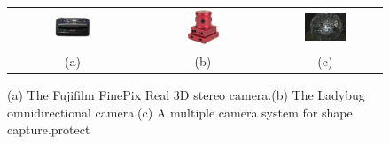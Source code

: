 \documentclass{report}
\begin{document}
\begin{savenotes}
\setlength{\tabcolsep}{4pt}
\begin{figure}
\centering
\begin{tabular}{ccc}
\includegraphics[trim=0.6in 0in 0.4in 0in, clip=true, width=0.3\textwidth]{images/fujifilm.eps}&
\includegraphics[width=0.27\textwidth]{images/ladybug.eps} & 
\includegraphics[width=0.4\textwidth]{images/uscSphere.eps} \\
(a) & (b) & (c)
\end{tabular}
\caption{(a) The Fujifilm FinePix Real 3D stereo camera.\protect\footnotemark[1] (b) The Ladybug omnidirectional camera.\protect\footnotemark[2] (c) A multiple camera system for shape capture.protect\protect\footnotemark[3]}
\label{productFig}
\end{figure}
\end{savenotes}
\end{document}
